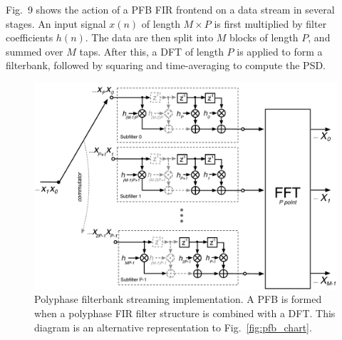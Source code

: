 \documentclass{ws-rv961x669}
\begin{document}
Fig.~9 shows the action of a PFB FIR frontend on a data stream in several stages. An input signal $x(n)$ of length $M\times P$ is first multiplied by filter coefficients $h(n)$. The data are then split into $M$ blocks of length $P$, and summed over $M$ taps. After this, a DFT of length $P$ is applied to form a filterbank, followed by squaring and time-averaging to compute the PSD.

\begin{figure}
 \centering
 \includegraphics[width=\textwidth]{./figures/pfb_fir_fft}
 \caption{Polyphase filterbank streaming implementation. A PFB is formed when a polyphase FIR filter structure is combined with a DFT. This diagram is an alternative representation to Fig.~\ref{fig:pfb_chart}.\label{fig:pfb_fir_fft}}
\end{figure}
\end{document}
